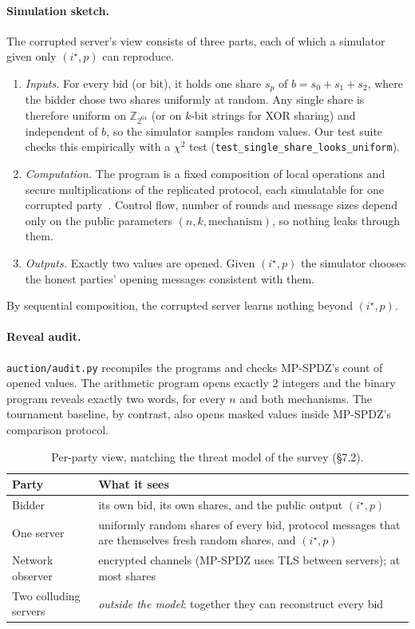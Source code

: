 \documentclass[11pt,a4paper]{article}
\newcommand{\Z}{\mathbb{Z}}
\newcommand{\code}[1]{\texttt{#1}}
\begin{document}
\paragraph{Simulation sketch.}
The corrupted server's view consists of three parts, each of which a simulator given only
$(i^\star, p)$ can reproduce.
\begin{enumerate}
  \item \emph{Inputs.} For every bid (or bit), it holds one share $s_p$ of
        $b = s_0 + s_1 + s_2$, where the bidder chose two shares uniformly at random. Any single
        share is therefore uniform on $\Z_{2^{64}}$ (or on $k$-bit strings for XOR sharing) and
        independent of $b$, so the simulator samples random values. Our test suite checks this
        empirically with a $\chi^2$ test (\code{test\_single\_share\_looks\_uniform}).
  \item \emph{Computation.} The program is a fixed composition of local operations and secure
        multiplications of the replicated protocol, each simulatable for one corrupted
        party~\cite{araki16}. Control flow, number of rounds and message sizes depend only on the
        public parameters $(n, k, \text{mechanism})$, so nothing leaks through them.
  \item \emph{Outputs.} Exactly two values are opened. Given $(i^\star, p)$ the simulator chooses
        the honest parties' opening messages consistent with them.
\end{enumerate}
By sequential composition, the corrupted server learns nothing beyond $(i^\star, p)$.

\paragraph{Reveal audit.}
\code{auction/audit.py} recompiles the programs and checks MP-SPDZ's count of opened values. The
arithmetic program opens exactly 2 integers and the binary program reveals exactly two words, for
every $n$ and both mechanisms. The tournament baseline, by contrast, also opens masked values inside
MP-SPDZ's comparison protocol.

\begin{table}[H]
\centering\small
\begin{tabularx}{\linewidth}{@{}l>{\raggedright\arraybackslash}X@{}}
\toprule
\textbf{Party} & \textbf{What it sees} \\
\midrule
Bidder & its own bid, its own shares, and the public output $(i^\star, p)$ \\
One server & uniformly random shares of every bid, protocol messages that are themselves fresh
             random shares, and $(i^\star, p)$ \\
Network observer & encrypted channels (MP-SPDZ uses TLS between servers); at most shares \\
Two colluding servers & \emph{outside the model}: together they can reconstruct every bid \\
\bottomrule
\end{tabularx}
\caption{Per-party view, matching the threat model of the survey (\S7.2).}
\label{tab:views}
\end{table}
\end{document}
